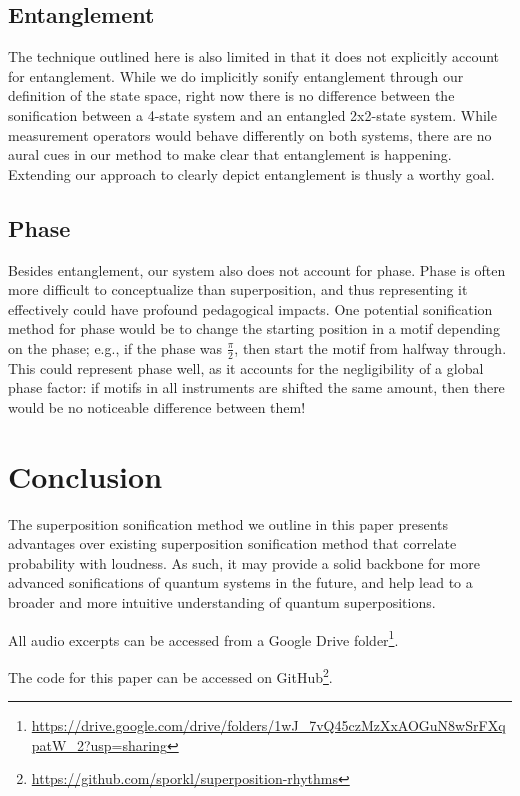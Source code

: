 \documentclass[10pt,twocolumn]{article}
\begin{document}
\subsection{Entanglement}

The technique outlined here is also limited in that it does not explicitly account for entanglement. While we do implicitly sonify entanglement through our definition of the state space, right now there is no difference between the sonification between a 4-state system and an entangled 2x2-state system. While measurement operators would behave differently on both systems, there are no aural cues in our method to make clear that entanglement is happening. Extending our approach to clearly depict entanglement is thusly a worthy goal.

\subsection{Phase}

Besides entanglement, our system also does not account for phase. Phase is often more difficult to conceptualize than superposition, and thus representing it effectively could have profound pedagogical impacts. One potential sonification method for phase would be to change the starting position in a motif depending on the phase; e.g., if the phase was $\frac{\pi}{2}$, then start the motif from halfway through. This could represent phase well, as it accounts for the negligibility of a global phase factor: if motifs in all instruments are shifted the same amount, then there would be no noticeable difference between them!

\section{Conclusion}

The superposition sonification method we outline in this paper presents advantages over existing superposition sonification method that correlate probability with loudness. As such, it may provide a solid backbone for more advanced sonifications of quantum systems in the future, and help lead to a broader and more intuitive understanding of quantum superpositions.

All audio excerpts can be accessed from a Google Drive folder\footnote{\url{https://drive.google.com/drive/folders/1wJ_7vQ45czMzXxAOGuN8wSrFXqpatW_2?usp=sharing}}.

The code for this paper can be accessed on GitHub\footnote{\url{https://github.com/sporkl/superposition-rhythms}}.
\end{document}
